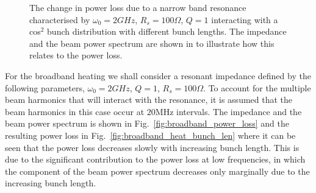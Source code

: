 \documentclass{cernyrep}
\begin{document}
\begin{figure}
\caption{ The change in power loss due to a narrow band resonance characterised by $\omega_{0} = 2GHz$, $R_{s} = 100\Omega$, $Q = 1$ interacting with a cos$^{2}$ bunch distribution with different bunch lengths. The impedance and the beam power spectrum are shown in  to illustrate how this relates to the power loss.}
\end{figure}


For the broadband heating we shall consider a resonant impedance defined by the following parameters, $\omega_{0} = 2GHz$, $Q=1$, $R_{s}=100\Omega$. To account for the multiple beam harmonics that will interact with the resonance, it is assumed that the beam harmonics in this case occur at $20$MHz intervals. The impedance and the beam power spectrum is shown in Fig.~\ref{fig:broadband_power_loss} and the resulting power loss in Fig.~\ref{fig:broadband_heat_bunch_len} where it can be seen that the power loss decreases slowly with increasing bunch length. This is due to the significant contribution to the power loss at low frequencies, in which the component of the beam power spectrum decreases only marginally due to the increasing bunch length.
\end{document}
